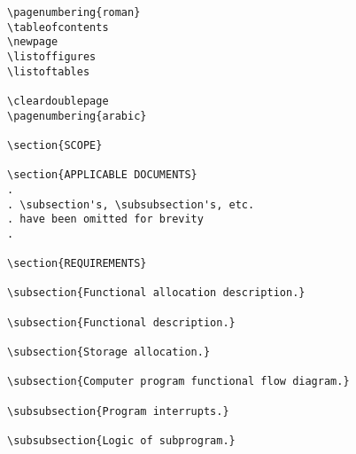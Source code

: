 \begin{itemize}
\begin{small}
\begin{verbatim}
\pagenumbering{roman}
\tableofcontents
\newpage
\listoffigures
\listoftables

\cleardoublepage
\pagenumbering{arabic}

\section{SCOPE}

\section{APPLICABLE DOCUMENTS}
.
. \subsection's, \subsubsection's, etc. 
. have been omitted for brevity
.  

\section{REQUIREMENTS}

\subsection{Functional allocation description.}

\subsection{Functional description.}

\subsection{Storage allocation.}

\subsection{Computer program functional flow diagram.}

\subsubsection{Program interrupts.}

\subsubsection{Logic of subprogram.}


\end{verbatim}
\end{small}
\end{itemize}
